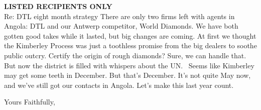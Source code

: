 \documentclass[12pt]{letter}
\begin{document}
\begin{letter}{{\bf LISTED RECIPIENTS ONLY}\\ \vspace{0.25in} Re: DTL eight month strategy}
There are only two firms left with agents in Angola:  DTL and our Antwerp competitor, World Diamonds.  We have both gotten good takes while it lasted, but big changes are coming.  At first we thought the Kimberley Process was just a toothless promise from the big dealers to soothe public outcry.  Certify the origin of rough diamonds?  Sure, we can handle that.  But now the district is filled with whispers about the UN. \ Seems like Kimberley may get some teeth in December.  But that's December.  It's not quite May now, and we've still got our contacts in Angola.  Let's make this last year count.


\closing{Yours Faithfully,}



\end{letter}
\end{document}
